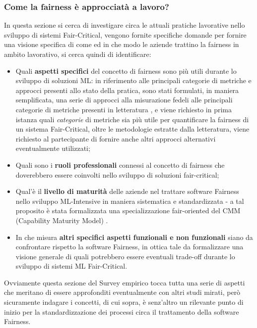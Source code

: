    \subsubsection{Come la fairness è approcciatà a lavoro?}
   
   In questa sezione si cerca di investigare circa le attuali pratiche lavorative nello sviluppo di sistemi Fair-Critical, vengono fornite specifiche domande per fornire una visione specifica di come ed in che modo le aziende trattino la fairness in ambito lavorativo, si cerca quindi di identificare:
   
   \begin{itemize}
       \item Quali \textbf{aspetti specifici} del concetto di fairness sono più utili durante lo sviluppo di soluzioni ML: in riferimento alle principali categorie di metriche e approcci presenti allo stato della pratica, sono stati formulati, in maniera semplificata, una serie di approcci alla misurazione fedeli alle principali categorie di metriche presenti in letteratura  \cite{FairnessDefinitionExplained}, e viene richiesto in prima istanza quali \emph{categorie} di metriche sia più utile per quantificare la fairness di un sistema Fair-Critical, oltre le metodologie estratte dalla letteratura, viene richiesto al partecipante di fornire anche altri approcci alternativi eventualmente utilizzati;
       \item Quali sono i \textbf{ruoli professionali} connessi al concetto di fairness che doverebbero essere coinvolti nello sviluppo di soluzioni fair-critical;
       \item Qual'è il \textbf{livello di maturità} delle aziende nel trattare software Fairness nello sviluppo ML-Intensive in maniera sistematica e standardizzata - a tal proposito è stata formalizzata una specializzazione fair-oriented del CMM (Capability Maturity Model) \cite{CMM}.
       \item In che misura \textbf{altri specifici aspetti funzionali e non funzionali} siano da confrontare rispetto la software Fairness, in ottica tale da formalizzare una visione generale di quali potrebbero essere eventuali trade-off durante lo sviluppo di sistemi ML Fair-Critical.
   \end{itemize}
   
   Ovviamente questa sezione del Survey empirico tocca tutta una serie di aspetti che meritano di essere approfonditi eventualmente con altri studi mirati, però sicuramente indagare i concetti, di cui sopra, è senz'altro un rilevante punto di inizio per la standardizzazione dei processi circa il trattamento della software Fairness. \\\\
   
